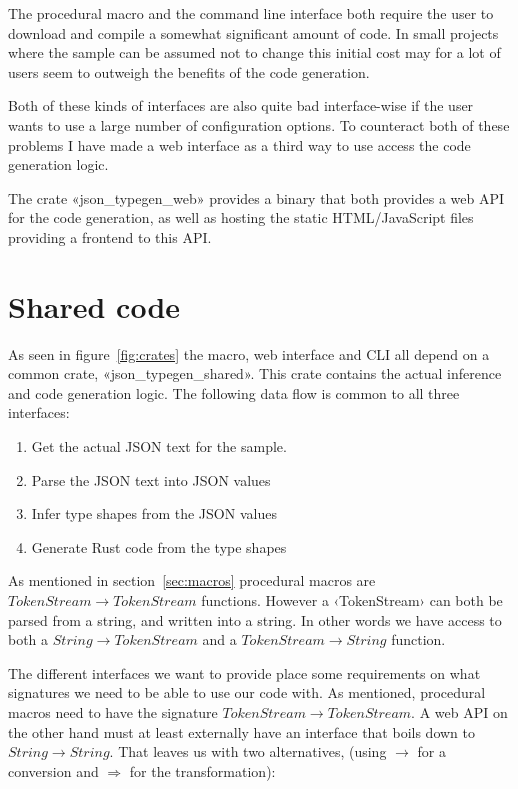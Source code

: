 
The procedural macro and the command line interface both require the user to download and compile a somewhat significant amount of code. In small projects where the sample can be assumed not to change this initial cost may for a lot of users seem to outweigh the benefits of the code generation.

Both of these kinds of interfaces are also quite bad interface-wise if the user wants to use a large number of configuration options. To counteract both of these problems I have made a web interface as a third way to use access the code generation logic.

The crate «json_typegen_web» provides a binary that both provides a web API for the code generation, as well as hosting the static HTML/JavaScript files providing a frontend to this API.

\section{Shared code}

As seen in figure~\ref{fig:crates} the macro, web interface and CLI all depend on a common crate, «json_typegen_shared». This crate contains the actual inference and code generation logic. The following data flow is common to all three interfaces:

\begin{enumerate}
  \item Get the actual JSON text for the sample.
  \item Parse the JSON text into JSON values
  \item Infer type shapes from the JSON values
  \item Generate Rust code from the type shapes
\end{enumerate}

As mentioned in section~\ref{sec:macros} procedural macros are $ TokenStream \rightarrow TokenStream $ functions. However a ‹TokenStream› can both be parsed from a string, and written into a string. In other words we have access to both a $ String \rightarrow TokenStream $ and a $ TokenStream \rightarrow String $ function.

The different interfaces we want to provide place some requirements on what signatures we need to be able to use our code with. As mentioned, procedural macros need to have the signature $ TokenStream \rightarrow TokenStream $. A web API on the other hand must at least externally have an interface that boils down to $ String \rightarrow String $. That leaves us with two alternatives, (using $\rightarrow$ for a conversion and $\Rightarrow$ for the transformation):

